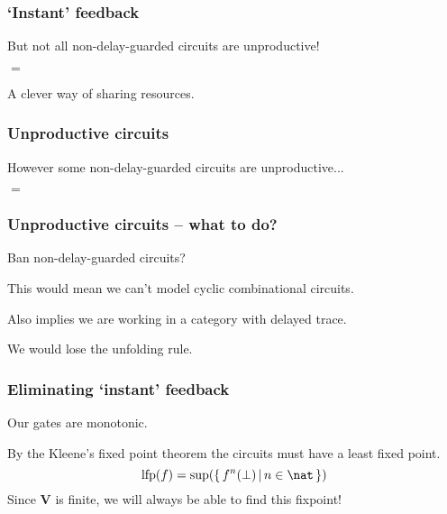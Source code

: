 \documentclass[aspectratio=169]{beamer}
\begin{document}
    \begin{frame}
        \frametitle{`Instant' feedback}
    
        But not all non-delay-guarded circuits are unproductive!
        
        \pause

        \begin{center}
            \pause
            \quad$=$\quad
        \end{center}

        \pause

        A clever way of \alert{sharing resources}.

    \end{frame}

    \begin{frame}
        \frametitle{Unproductive circuits}
    
        However some non-delay-guarded circuits \alert{are} unproductive...
    
        \begin{center}
            \pause
            \pause
            \quad$=$\quad

        \end{center}

    \end{frame}

    \begin{frame}
        \frametitle{Unproductive circuits -- what to do?}
    
        Ban non-delay-guarded circuits?

        \pause

        This would mean we can't model cyclic combinational circuits.

        \pause

        Also implies we are working in a category with \alert{delayed trace}.
        
        \pause

        We would lose the \alert{unfolding} rule.
    
    \end{frame}

    \begin{frame}
        \frametitle{Eliminating `instant' feedback}
    
        Our gates are \alert{monotonic}.

        By the \alert{Kleene's fixed point theorem} the circuits must have a \alert
        {least fixed point}.
        \[\text{lfp}(f) = \text{sup}(\{\,f^n(\bot) \,|\, n \in \nat\,\})\]
        Since $\textbf{V}$ is finite, we will always be able to find this fixpoint!
    \end{frame}
\end{document}
